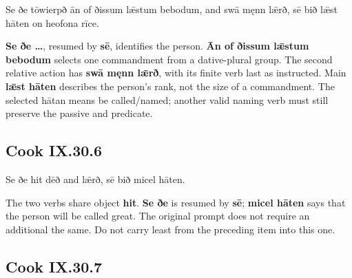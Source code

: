 \par\begin{minipage}{\linewidth}\raggedright
Se ðe tōwierpð ān of ðissum lǣstum bebodum, and swā męnn lǣrð, sē bið lǣst hāten on heofona rīce.

\textbf{Se ðe …}, resumed by \textbf{sē}, identifies the person. \textbf{Ān of ðissum lǣstum bebodum} selects one commandment from a dative-plural group. The second relative action has \textbf{swā męnn lǣrð}, with its finite verb last as instructed. Main \textbf{lǣst hāten} describes the person’s rank, not the size of a commandment. The selected hātan means be called/\allowbreak{}named; another valid naming verb must still preserve the passive and predicate.

\end{minipage}\par\addvspace{4pt}

\subsection*{Cook IX.30.6}

\par\begin{minipage}{\linewidth}\raggedright
Se ðe hit dēð and lǣrð, sē bið micel hāten.

The two verbs share object \textbf{hit}. \textbf{Se ðe} is resumed by \textbf{sē}; \textbf{micel hāten} says that the person will be called great. The original prompt does not require an additional the same. Do not carry least from the preceding item into this one.

\end{minipage}\par\addvspace{4pt}

\subsection*{Cook IX.30.7}

